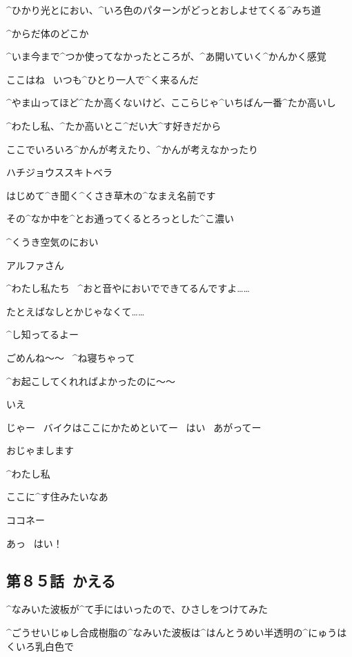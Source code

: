 \Kokone ^{ひかり}{光}とにおい、^{いろ}{色}のパターンがどっとおしよせてくる^{みち}{道}

\page
\Kokone ^{からだ}{体}のどこか

\Kokone ^{いま}{今}まで^{つか}{使}ってなかったところが、^{あ}{開}いていく^{かんかく}{感覚}

\page[103]
\Alpha ここはね
\ いつも^{ひとり}{一人}で^{く}{来}るんだ

\Alpha ^{やま}{山}ってほど^{たか}{高}くないけど、ここらじゃ^{いちばん}{一番}^{たか}{高}いし

\Alpha ^{わたし}{私}、^{たか}{高}いとこ^{だい}{大}^{す}{好}きだから

\Alpha ここでいろいろ^{かんが}{考}えたり、^{かんが}{考}えなかったり

\page
\Kokone ハチジョウススキトベラ

\Kokone はじめて^{き}{聞}く^{くさき}{草木}の^{なまえ}{名前}です

\Kokone その^{なか}{中}を^{とお}{通}ってくるとろっとした^{こ}{濃}い

\Kokone ^{くうき}{空気}のにおい

\page
\Kokone アルファさん

\Kokone ^{わたし}{私}たち
\ ^{おと}{音}やにおいでできてるんですよ……

\Kokone たとえばなしとかじゃなくて……

\Alpha ^{し}{知}ってるよー

\page[108]
\Alpha ごめんね〜〜
\ ^{ね}{寝}ちゃって

\Alpha ^{お}{起}こしてくれればよかったのに〜〜

\Kokone いえ

\page
\Alpha じゃー
\ バイクはここにかためといてー
\ はい
\ あがってー

\Kokone おじゃまします

\Kokone ^{わたし}{私}

\Kokone ここに^{す}{住}みたいなあ

\page
\Alpha ココネー

\Kokone あっ
\ はい！


\subsection{第８５話\ かえる}

\page[115]
\Alpha ^{なみいた}{波板}が^{て}{手}にはいったので、ひさしをつけてみた

\Alpha ^{ごうせいじゅし}{合成樹脂}の^{なみいた}{波板}は^{はんとうめい}{半透明}の^{にゅうはくいろ}{乳白色}で

